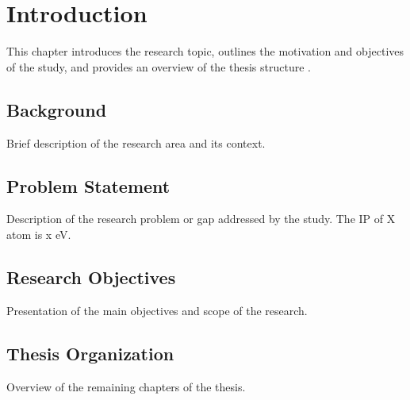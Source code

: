 \chapter{Introduction}
\label{chap:introduction}

This chapter introduces the research topic, outlines the motivation and objectives of the study, and provides an overview of the thesis structure \cite{atia-tul-noor_sub-50_2024}.

\section{Background}
Brief description of the research area and its context.

\section{Problem Statement}
Description of the research problem or gap addressed by the study. The \gls{IP} of X atom is x eV.

\section{Research Objectives}
Presentation of the main objectives and scope of the research.

\section{Thesis Organization}
Overview of the remaining chapters of the thesis.
